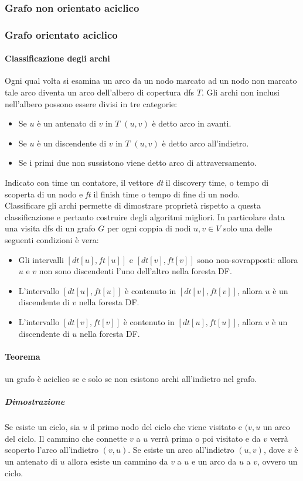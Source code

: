 \subsubsection{Grafo non orientato aciclico}



\subsubsection{Grafo orientato aciclico}
\paragraph{Classificazione degli archi}
Ogni qual volta si esamina un arco da un nodo marcato ad un nodo non marcato tale arco diventa un arco dell'albero di copertura dfs $T$. Gli archi non 
inclusi nell'albero possono essere divisi in tre categorie:
\begin{itemize}
\item Se $u$ \`e un antenato di $v$ in $T$ $(u, v)$ \`e detto arco in avanti.
\item Se $u$ \`e un discendente di $v$ in $T$ $(u, v)$ \`e detto arco all'indietro.
\item Se i primi due non sussistono viene detto arco di attraversamento. 
\end{itemize}
Indicato con time un contatore, il vettore \emph{dt} il discovery time, o tempo di scoperta di un nodo e \emph{ft} il finish time o tempo di fine di un 
nodo.\\

Classificare gli archi permette di dimostrare propriet\`a rispetto a questa classificazione e pertanto costruire degli algoritmi migliori. In particolare 
data una visita dfs di un grafo $G$ per ogni coppia di nodi $u, v\in V$ solo una delle seguenti condizioni \`e vera:
\begin{itemize}
\item Gli intervalli $[dt[u], ft[u]]$ e $[dt[v], ft[v]]$ sono non-sovrapposti: allora $u$ e $v$ non sono discendenti l'uno dell'altro nella foresta DF.
\item L'intervallo $[dt[u], ft[u]]$ \`e contenuto in $[dt[v], ft[v]]$, allora $u$ \`e un discendente di $v$ nella foresta DF.
\item L'intervallo $[dt[v], ft[v]]$ \`e contenuto in $[dt[u], ft[u]]$, allora $v$ \`e un discendente di $u$ nella foresta DF.
\end{itemize}
\paragraph{Teorema}
un grafo \`e aciclico se e solo se non esistono archi all'indietro nel grafo.
\subparagraph{Dimostrazione}
Se esiste un ciclo, sia $u$ il primo nodo del ciclo che viene visitato e $(v, u$ un arco del ciclo. Il cammino che connette $v$ a $u$ verr\`a prima o poi
visitato e da $v$ verr\`a scoperto l'arco all'indietro $(v, u)$. Se esiste un arco all'indietro $(u, v)$, dove $v$ \`e un antenato di $u$ allora esiste
un cammino da $v$ a $u$ e un arco da $u$ a $v$, ovvero un ciclo.

